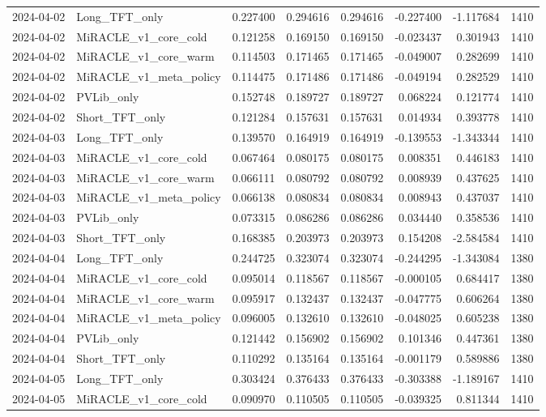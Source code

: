 \begin{tabular}{llrrrrrr}
2024-04-02 & Long_TFT_only & 0.227400 & 0.294616 & 0.294616 & -0.227400 & -1.117684 & 1410 \\
2024-04-02 & MiRACLE_v1_core_cold & 0.121258 & 0.169150 & 0.169150 & -0.023437 & 0.301943 & 1410 \\
2024-04-02 & MiRACLE_v1_core_warm & 0.114503 & 0.171465 & 0.171465 & -0.049007 & 0.282699 & 1410 \\
2024-04-02 & MiRACLE_v1_meta_policy & 0.114475 & 0.171486 & 0.171486 & -0.049194 & 0.282529 & 1410 \\
2024-04-02 & PVLib_only & 0.152748 & 0.189727 & 0.189727 & 0.068224 & 0.121774 & 1410 \\
2024-04-02 & Short_TFT_only & 0.121284 & 0.157631 & 0.157631 & 0.014934 & 0.393778 & 1410 \\
2024-04-03 & Long_TFT_only & 0.139570 & 0.164919 & 0.164919 & -0.139553 & -1.343344 & 1410 \\
2024-04-03 & MiRACLE_v1_core_cold & 0.067464 & 0.080175 & 0.080175 & 0.008351 & 0.446183 & 1410 \\
2024-04-03 & MiRACLE_v1_core_warm & 0.066111 & 0.080792 & 0.080792 & 0.008939 & 0.437625 & 1410 \\
2024-04-03 & MiRACLE_v1_meta_policy & 0.066138 & 0.080834 & 0.080834 & 0.008943 & 0.437037 & 1410 \\
2024-04-03 & PVLib_only & 0.073315 & 0.086286 & 0.086286 & 0.034440 & 0.358536 & 1410 \\
2024-04-03 & Short_TFT_only & 0.168385 & 0.203973 & 0.203973 & 0.154208 & -2.584584 & 1410 \\
2024-04-04 & Long_TFT_only & 0.244725 & 0.323074 & 0.323074 & -0.244295 & -1.343084 & 1380 \\
2024-04-04 & MiRACLE_v1_core_cold & 0.095014 & 0.118567 & 0.118567 & -0.000105 & 0.684417 & 1380 \\
2024-04-04 & MiRACLE_v1_core_warm & 0.095917 & 0.132437 & 0.132437 & -0.047775 & 0.606264 & 1380 \\
2024-04-04 & MiRACLE_v1_meta_policy & 0.096005 & 0.132610 & 0.132610 & -0.048025 & 0.605238 & 1380 \\
2024-04-04 & PVLib_only & 0.121442 & 0.156902 & 0.156902 & 0.101346 & 0.447361 & 1380 \\
2024-04-04 & Short_TFT_only & 0.110292 & 0.135164 & 0.135164 & -0.001179 & 0.589886 & 1380 \\
2024-04-05 & Long_TFT_only & 0.303424 & 0.376433 & 0.376433 & -0.303388 & -1.189167 & 1410 \\
2024-04-05 & MiRACLE_v1_core_cold & 0.090970 & 0.110505 & 0.110505 & -0.039325 & 0.811344 & 1410 \\

\end{tabular}
